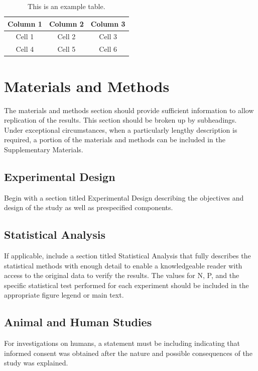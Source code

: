 \documentclass{article}
\begin{document}
\begin{table}[b]
    \caption{This is an example table.}    
    \centering
    \begin{tabular}{ccc}
            \hline
            Column 1 & Column 2 & Column 3 \\  
            \hline
            Cell 1 & Cell 2 & Cell 3\\ 
            Cell 4 & Cell 5 & Cell 6 \\
            \hline
            \end{tabular}

    \label{tab:1}
\end{table}

\section{Materials and Methods}
The materials and methods section should provide sufficient information to allow replication of the results. This section should be broken up by subheadings. Under exceptional circumstances, when a particularly lengthy description is required, a portion of the materials and methods can be included in the Supplementary Materials. 

\subsection{Experimental Design}
Begin with a section titled Experimental Design describing the objectives and design of the study as well as prespecified components. 

\subsection{Statistical Analysis}
If applicable, include a section titled Statistical Analysis that fully describes the statistical methods with enough detail to enable a knowledgeable reader with access to the original data to verify the results. The values for N, P, and the specific statistical test performed for each experiment should be included in the appropriate figure legend or main text. 

\subsection{Animal and Human Studies}
For investigations on humans, a statement must be including indicating that informed consent was obtained after the nature and possible consequences of the study was explained.
\end{document}
